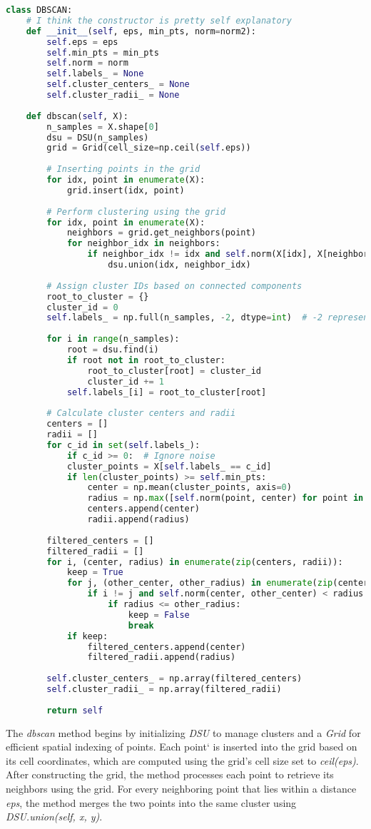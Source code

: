 \documentclass{article}
\begin{document}
	\begin{lstlisting}[language=python]
class DBSCAN:
	# I think the constructor is pretty self explanatory
	def __init__(self, eps, min_pts, norm=norm2):
		self.eps = eps
		self.min_pts = min_pts
		self.norm = norm
		self.labels_ = None
		self.cluster_centers_ = None
		self.cluster_radii_ = None
	
	def dbscan(self, X):
		n_samples = X.shape[0]
		dsu = DSU(n_samples)
		grid = Grid(cell_size=np.ceil(self.eps))
		
		# Inserting points in the grid
		for idx, point in enumerate(X):
			grid.insert(idx, point)
		
		# Perform clustering using the grid
		for idx, point in enumerate(X):
			neighbors = grid.get_neighbors(point)
			for neighbor_idx in neighbors:
				if neighbor_idx != idx and self.norm(X[idx], X[neighbor_idx]) <= self.eps:
					dsu.union(idx, neighbor_idx)
		
		# Assign cluster IDs based on connected components
		root_to_cluster = {}
		cluster_id = 0
		self.labels_ = np.full(n_samples, -2, dtype=int)  # -2 represents noise points
		
		for i in range(n_samples):
			root = dsu.find(i)
			if root not in root_to_cluster:
				root_to_cluster[root] = cluster_id
				cluster_id += 1
			self.labels_[i] = root_to_cluster[root]
		
		# Calculate cluster centers and radii
		centers = []
		radii = []
		for c_id in set(self.labels_):
			if c_id >= 0:  # Ignore noise
			cluster_points = X[self.labels_ == c_id]
			if len(cluster_points) >= self.min_pts:
				center = np.mean(cluster_points, axis=0)
				radius = np.max([self.norm(point, center) for point in cluster_points])
				centers.append(center)
				radii.append(radius)
			
		filtered_centers = []
		filtered_radii = []
		for i, (center, radius) in enumerate(zip(centers, radii)):
			keep = True
			for j, (other_center, other_radius) in enumerate(zip(centers, radii)):
				if i != j and self.norm(center, other_center) < radius + other_radius:
					if radius <= other_radius:
						keep = False
						break
			if keep:
				filtered_centers.append(center)
				filtered_radii.append(radius)
		
		self.cluster_centers_ = np.array(filtered_centers)
		self.cluster_radii_ = np.array(filtered_radii)
		
		return self\end{lstlisting}
	
	The \textit{dbscan} method begins by initializing \textit{DSU} to manage clusters and a \textit{Grid} for efficient spatial indexing of points. Each point` is inserted into the grid based on its cell coordinates, which are computed using the grid's cell size set to \textit{ceil(eps)}. After constructing the grid, the method processes each point to retrieve its neighbors using the grid. For every neighboring point that lies within a distance \textit{eps}, the method merges the two points into the same cluster using \textit{DSU.union(self, x, y)}.
	
\end{document}

